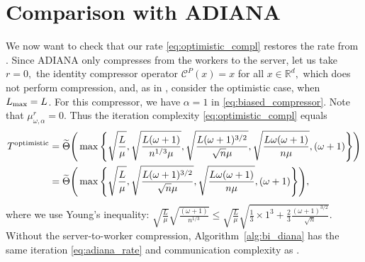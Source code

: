 \documentclass{article} %
\newcommand{\R}{\mathbb{R}} %
\newcommand{\cC}{\mathcal{C}}
\theoremstyle{plain}
\theoremstyle{definition}
\theoremstyle{remark}
\newcommand{\green}{\color{mydarkgreen}}
\newcommand{\algnamebig}[1]{{\sf\green #1}}
\newcommand{\algname}[1]{{\small\green\sf #1}}
\begin{document}
\section{Comparison with \algnamebig{ADIANA}}
\label{sec:comp_adiana}
We now want to check that our rate \eqref{eq:optimistic_compl} restores the rate from \citep{ADIANA}. Since \algname{ADIANA} only compresses from the workers to the server, let us take $r = 0,$ the identity compressor operator $\cC^{P}(x) = x$ for all $x \in \R^d,$ which does not perform compression, and, as in \citep{ADIANA}, consider the optimistic case, when $L_{\textnormal{max}} = L$. For this compressor, we have $\alpha = 1$ in \eqref{eq:biased_compressor}. Note that $\mu^r_{\omega, \alpha} = 0.$ Thus the iteration complexity \eqref{eq:optimistic_compl} equals
\begin{align}
  T^{\textnormal{optimistic}} &= \widetilde{\Theta}\Bigg(\max\Bigg\{\sqrt{\frac{L}{\mu}}, \sqrt{\frac{L (\omega + 1)}{n^{1/3} \mu}}, \sqrt{\frac{L (\omega + 1)^{3/2}}{\sqrt{n} \mu}}, \sqrt{\frac{L \omega (\omega + 1)}{n \mu}}, (\omega + 1)\Bigg\}\Bigg) \nonumber \\
  &= \widetilde{\Theta}\Bigg(\max\Bigg\{\sqrt{\frac{L}{\mu}}, \sqrt{\frac{L (\omega + 1)^{3/2}}{\sqrt{n} \mu}}, \sqrt{\frac{L \omega (\omega + 1)}{n \mu}}, (\omega + 1)\Bigg\}\Bigg), \label{eq:adiana_rate}
\end{align}
where we use Young's inequality: $\sqrt{\frac{L}{\mu}}\sqrt{\frac{(\omega + 1)}{n^{1/3}}} \leq \sqrt{\frac{L}{\mu}}\sqrt{\frac{1}{3} \times 1^3 + \frac{2}{3} \frac{(\omega + 1)^{3/2}}{\sqrt{n}}}.$ Without the server-to-worker compression, Algorithm~\ref{alg:bi_diana} has the same iteration \eqref{eq:adiana_rate} and communication complexity as \citep{ADIANA}.
\end{document}
